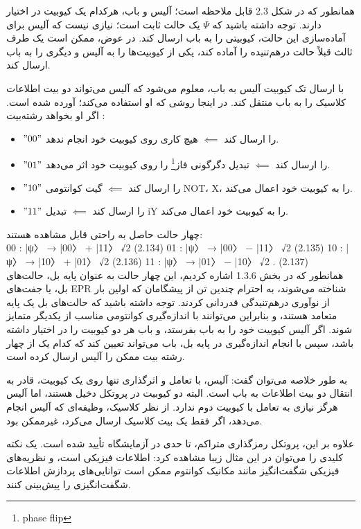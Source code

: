 \documentclass{book}
\begin{document}
همانطور که در شکل 2.3 قابل ملاحظه است؛ آلیس و باب، هرکدام یک کیوبیت در اختیار دارند. توجه داشته باشید که $\Psi$ یک حالت ثابت است؛ نیازی نیست که آلیس برای آماده‌سازی این حالت، کیوبیتی را به باب ارسال کند. در عوض، ممکن است یک طرف ثالث قبلاً حالت درهم‌تنیده را آماده کند، یکی از کیوبیت‌ها را به آلیس و دیگری را به باب ارسال کند.

با ارسال تک کیوبیت آلیس  به باب، معلوم می‌شود که آلیس می‌تواند دو بیت اطلاعات کلاسیک را به باب منتقل کند. در اینجا روشی که او استفاده می‌کند؛ آورده شده است. اگر او بخواهد رشته‌بیت :

\begin{itemize}
	\item  $"00"$ را ارسال کند $\impliedby$ هیچ کاری روی کیوبیت خود انجام ندهد.
	\item $"01"$ را ارسال کند $\impliedby$ تبدیل دگرگونی فاز\footnote{phase flip} را روی کیوبیت خود اثر می‌دهد.
	\item  $"10"$ را ارسال کند $\impliedby$ گیت کوانتومی NOT، X، را به کیوبیت خود اعمال می‌کند.
	\item  $"11"$ را ارسال کند $\impliedby$ تبدیل iY را به کیوبیت خود اعمال می‌کند.
\end{itemize}
چهار حالت حاصل به راحتی قابل مشاهده هستند:\\
00 : |ψ〉 → |00〉 + |11〉
√2 (2.134)
01 : |ψ〉 → |00〉 − |11〉
√2 (2.135)
10 : |ψ〉 → |10〉 + |01〉
√2 (2.136)
11 : |ψ〉 → |01〉 − |10〉
√2 . (2.137)\\


همانطور که در بخش 1.3.6 اشاره کردیم، این چهار حالت به عنوان پایه بل، حالت‌های بل، یا جفت‌های EPR شناخته می‌شوند، به احترام چندین تن از پیشگامان که اولین بار از نوآوری درهم‌تنیدگی قدردانی کردند. توجه داشته باشید که حالت‌های بل یک پایه متعامد هستند، و بنابراین می‌توانند با اندازه‌گیری کوانتومی مناسب از یکدیگر متمایز شوند. اگر آلیس کیوبیت خود را به باب بفرستد، و باب هر دو کیوبیت را در اختیار داشته باشد، سپس با انجام اندازه‌گیری در پایه بل، باب می‌تواند تعیین کند که کدام یک از چهار رشته بیت ممکن را آلیس ارسال کرده است.

به طور خلاصه می‌توان گفت:
 آلیس، با تعامل و اثرگذاری تنها روی یک کیوبیت، قادر به انتقال دو بیت اطلاعات به باب است. البته دو کیوبیت در پروتکل دخیل هستند، اما آلیس هرگز نیازی به تعامل با کیوبیت دوم ندارد. از نظر کلاسیک، وظیفه‌ای که آلیس انجام می‌دهد، اگر فقط یک بیت کلاسیک ارسال می‌کرد، غیرممکن بود.

علاوه بر این، پروتکل رمزگذاری متراکم، تا حدی در آزمایشگاه تأیید شده است.  یک نکته کلیدی را می‌توان در این مثال زیبا مشاهده کرد: اطلاعات فیزیکی است، و نظریه‌های فیزیکی شگفت‌انگیز مانند مکانیک کوانتوم ممکن است توانایی‌های پردازش اطلاعات شگفت‌انگیزی را پیش‌بینی کنند.
\end{document}
